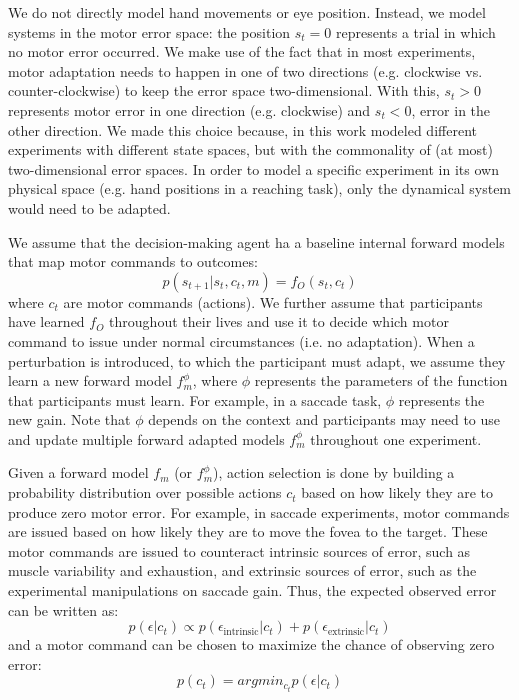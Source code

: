 \documentclass[a4paper,doc,floatsintext,natbib]{apa6}
\begin{document}
We do not directly model hand movements or eye position. Instead, we model
systems in the motor error space: the position $s_t = 0$ represents a trial in
which no motor error occurred. We make use of the fact that in most
experiments, motor adaptation needs to happen in one of two directions
(e.g. clockwise vs. counter-clockwise) to keep the error space
two-dimensional. With this, $s_t > 0$ represents motor error in one direction
(e.g. clockwise) and $s_t < 0$, error in the other direction. We made this
choice because, in this work modeled different experiments with
different state spaces, but with the commonality of (at most)
two-dimensional error spaces. In order to model a specific experiment in its
own physical space (e.g. hand positions in a reaching task), only the dynamical
system would need to be adapted.

We assume that the decision-making agent ha a baseline internal forward models that
map motor commands to outcomes:
\begin{equation}
p(s_{t+1} | s_t, c_t, m) = f_O(s_t, c_t)
\end{equation}
where $c_t$ are motor commands (actions). We further assume that participants
have learned $f_O$ throughout their lives and use it to decide which motor
command to issue under normal circumstances (i.e. no adaptation). When a
perturbation is introduced, to which the participant must adapt, we assume they
learn a new forward model $f_m^{\phi}$, where $\phi$ represents the parameters
of the function that participants must learn. For example, in a saccade task,
$\phi$ represents the new gain. Note that $\phi$ depends on the context and
participants may need to use and update multiple forward adapted models
$f_m^{\phi}$ throughout one experiment.

Given a forward model $f_m$ (or $f_m^\phi$), action selection is done by
building a probability distribution over possible actions $c_t$ based on how
likely they are to produce zero motor error. For example, in saccade
experiments, motor commands are issued based on how likely they are to move the
fovea to the target. These motor commands are issued to counteract intrinsic
sources of error, such as muscle variability and exhaustion, and extrinsic
sources of error, such as the experimental manipulations on saccade gain. Thus,
the expected observed error can be written as:
\begin{equation}
p(\epsilon | c_t) \propto p(\epsilon_{\text{intrinsic}} | c_t) + p(\epsilon_{\text{extrinsic}} | c_t)
\end{equation}
and a motor command can be chosen to maximize the chance of observing zero error:
\begin{equation}
p(c_t) = argmin_{c_t} p(\epsilon | c_t)
\end{equation}
\end{document}
